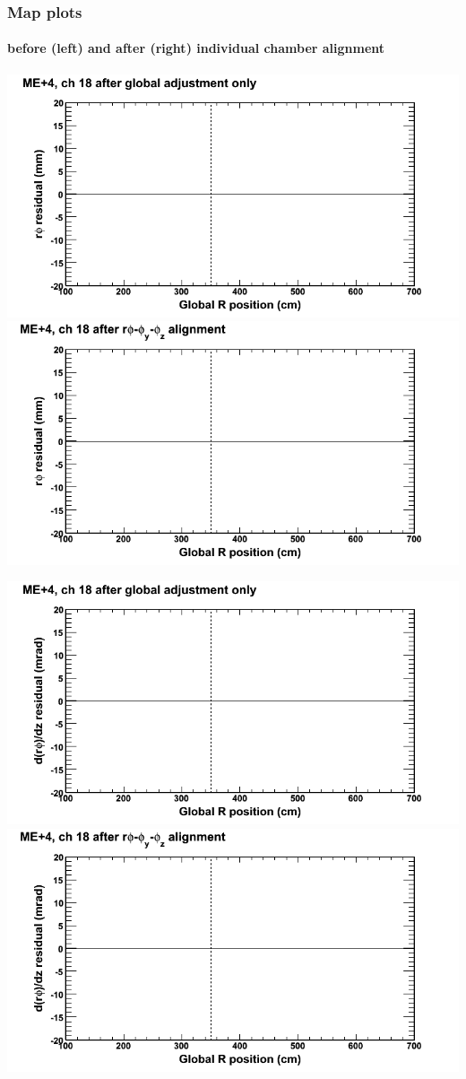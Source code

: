 \documentclass[compress]{beamer}
\begin{document}
\begin{frame}
\frametitle{Map plots}
\framesubtitle{before (left) and after (right) individual chamber alignment}
\includegraphics[width=0.5\linewidth]{ringmapplots_3dof/before_CSCvsr_mep4ch18_x.png} \includegraphics[width=0.5\linewidth]{ringmapplots_3dof/after_CSCvsr_mep4ch18_x.png}

\includegraphics[width=0.5\linewidth]{ringmapplots_3dof/before_CSCvsr_mep4ch18_dxdz.png} \includegraphics[width=0.5\linewidth]{ringmapplots_3dof/after_CSCvsr_mep4ch18_dxdz.png}
\end{frame}
\end{document}
